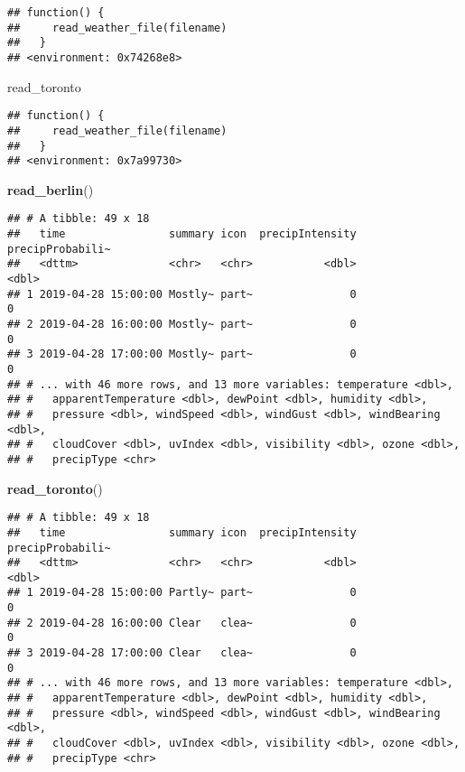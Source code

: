 \documentclass[]{book}
\newenvironment{Shaded}{\begin{snugshade}}{\end{snugshade}}
\newcommand{\KeywordTok}[1]{\textcolor[rgb]{0.13,0.29,0.53}{\textbf{#1}}}
\newcommand{\NormalTok}[1]{#1}
\begin{document}
\begin{verbatim}
## function() {
##     read_weather_file(filename)
##   }
## <environment: 0x74268e8>
\end{verbatim}

\begin{Shaded}
\begin{Highlighting}[]
\NormalTok{read_toronto}
\end{Highlighting}
\end{Shaded}

\begin{verbatim}
## function() {
##     read_weather_file(filename)
##   }
## <environment: 0x7a99730>
\end{verbatim}

\begin{Shaded}
\begin{Highlighting}[]
\KeywordTok{read_berlin}\NormalTok{()}
\end{Highlighting}
\end{Shaded}

\begin{verbatim}
## # A tibble: 49 x 18
##   time                summary icon  precipIntensity precipProbabili~
##   <dttm>              <chr>   <chr>           <dbl>            <dbl>
## 1 2019-04-28 15:00:00 Mostly~ part~               0                0
## 2 2019-04-28 16:00:00 Mostly~ part~               0                0
## 3 2019-04-28 17:00:00 Mostly~ part~               0                0
## # ... with 46 more rows, and 13 more variables: temperature <dbl>,
## #   apparentTemperature <dbl>, dewPoint <dbl>, humidity <dbl>,
## #   pressure <dbl>, windSpeed <dbl>, windGust <dbl>, windBearing <dbl>,
## #   cloudCover <dbl>, uvIndex <dbl>, visibility <dbl>, ozone <dbl>,
## #   precipType <chr>
\end{verbatim}

\begin{Shaded}
\begin{Highlighting}[]
\KeywordTok{read_toronto}\NormalTok{()}
\end{Highlighting}
\end{Shaded}

\begin{verbatim}
## # A tibble: 49 x 18
##   time                summary icon  precipIntensity precipProbabili~
##   <dttm>              <chr>   <chr>           <dbl>            <dbl>
## 1 2019-04-28 15:00:00 Partly~ part~               0                0
## 2 2019-04-28 16:00:00 Clear   clea~               0                0
## 3 2019-04-28 17:00:00 Clear   clea~               0                0
## # ... with 46 more rows, and 13 more variables: temperature <dbl>,
## #   apparentTemperature <dbl>, dewPoint <dbl>, humidity <dbl>,
## #   pressure <dbl>, windSpeed <dbl>, windGust <dbl>, windBearing <dbl>,
## #   cloudCover <dbl>, uvIndex <dbl>, visibility <dbl>, ozone <dbl>,
## #   precipType <chr>
\end{verbatim}
\end{document}
